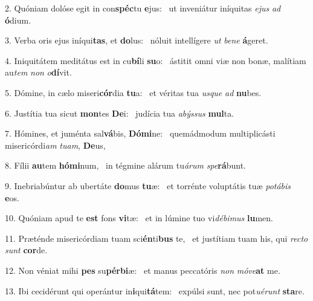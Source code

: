 2. Quóniam dolóse egit in con\textbf{spéc}tu \textbf{e}jus: \ast\  ut inveniátur iníquitas \textit{e}\textit{jus} \textit{ad} \textbf{ó}dium.\

3. Verba oris ejus iníqui\textbf{tas}, et \textbf{do}lus: \ast\  nóluit intellígere \textit{ut} \textit{be}\textit{ne} \textbf{á}geret.\

4. Iniquitátem meditátus est in cu\textbf{bí}li \textbf{su}o: \ast\  ástitit omni viæ non bonæ, malítiam au\textit{tem} \textit{non} \textit{o}\textbf{dí}vit.\

5. Dómine, in cælo miseri\textbf{cór}dia \textbf{tu}a: \ast\  et véritas tua \textit{us}\textit{que} \textit{ad} \textbf{nu}bes.\

6. Justítia tua sicut \textbf{mon}tes \textbf{De}i: \ast\  judícia tua \textit{a}\textit{býs}\textit{sus} \textbf{mul}ta.\

7. Hómines, et juménta sal\textbf{vá}bis, \textbf{Dó}\textbf{mi}ne: \ast\  quemádmodum multiplicásti misericórdi\textit{am} \textit{tu}\textit{am}, \textbf{De}us,\

8. Fílii \textbf{au}tem \textbf{hó}\textbf{mi}num, \ast\  in tégmine alárum tu\textit{á}\textit{rum} \textit{spe}\textbf{rá}bunt.\

9. Inebriabúntur ab ubertáte \textbf{do}mus \textbf{tu}æ: \ast\  et torrénte voluptátis tuæ \textit{po}\textit{tá}\textit{bis} \textbf{e}os.\

10. Quóniam apud te \textbf{est} fons \textbf{vi}tæ: \ast\  et in lúmine tuo vi\textit{dé}\textit{bi}\textit{mus} \textbf{lu}men.\

11. Præténde misericórdiam tuam sci\textbf{én}ti\textbf{bus} te, \ast\  et justítiam tuam his, qui \textit{rec}\textit{to} \textit{sunt} \textbf{cor}de.\

12. Non véniat mihi \textbf{pes} su\textbf{pér}\textbf{bi}æ: \ast\  et manus peccatóris \textit{non} \textit{mó}\textit{ve}\textbf{at} me.\

13. Ibi cecidérunt qui operántur in\textbf{i}qui\textbf{tá}tem: \ast\  expúlsi sunt, nec pot\textit{u}\textit{é}\textit{runt} \textbf{sta}re.\

